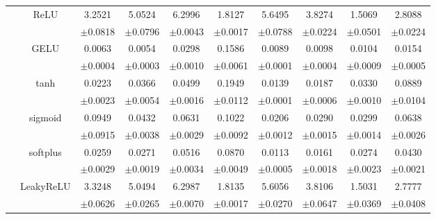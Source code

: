 \documentclass{article}
\begin{document}
\begin{longtable}[h!]{cccccccccc}
        & \multirow{2}{*}{ReLU}
        &3.2521 & 5.0524 & 6.2996 & 1.8127 & 5.6495 & 3.8274 & 1.5069 & 2.8088\\
        &&\scriptsize $\pm$0.0818&\scriptsize$\pm$0.0796&\scriptsize$\pm$0.0043&\scriptsize$\pm$0.0017&\scriptsize$\pm$0.0788&\scriptsize$\pm$0.0224&\scriptsize$\pm$0.0501&\scriptsize$\pm$0.0224\\
        \cline{3-10}\rule{0pt}{2.3ex}

        & \multirow{2}{*}{GELU}
        &0.0063 & 0.0054 & 0.0298 & 0.1586 & 0.0089 & 0.0098 & 0.0104 & 0.0154\\
        &&\scriptsize $\pm$0.0004&\scriptsize$\pm$0.0003&\scriptsize$\pm$0.0010&\scriptsize$\pm$0.0061&\scriptsize$\pm$0.0001&\scriptsize$\pm$0.0004&\scriptsize$\pm$0.0009&\scriptsize$\pm$0.0005\\
        \cline{3-10}\rule{0pt}{2.3ex}

        & \multirow{2}{*}{tanh}
        &0.0223 & 0.0366 & 0.0499 & 0.1949 & 0.0139 & 0.0187 & 0.0330 & 0.0889\\
        &&\scriptsize $\pm$0.0023&\scriptsize$\pm$0.0054&\scriptsize$\pm$0.0016&\scriptsize$\pm$0.0112&\scriptsize$\pm$0.0001&\scriptsize$\pm$0.0006&\scriptsize$\pm$0.0010&\scriptsize$\pm$0.0104\\
        \cline{3-10}\rule{0pt}{2.3ex}

        & \multirow{2}{*}{sigmoid}
        &0.0949 & 0.0432 & 0.0631 & 0.1022 & 0.0206 & 0.0290 & 0.0299 & 0.0638\\
        &&\scriptsize $\pm$0.0915&\scriptsize$\pm$0.0038&\scriptsize$\pm$0.0029&\scriptsize$\pm$0.0092&\scriptsize$\pm$0.0012&\scriptsize$\pm$0.0015&\scriptsize$\pm$0.0014&\scriptsize$\pm$0.0026\\
        \cline{3-10}\rule{0pt}{2.3ex}

        & \multirow{2}{*}{softplus}
        &0.0259 & 0.0271 & 0.0516 & 0.0870 & 0.0113 & 0.0161 & 0.0274 & 0.0430\\
        &&\scriptsize $\pm$0.0029&\scriptsize$\pm$0.0019&\scriptsize$\pm$0.0034&\scriptsize$\pm$0.0049&\scriptsize$\pm$0.0005&\scriptsize$\pm$0.0018&\scriptsize$\pm$0.0023&\scriptsize$\pm$0.0021\\
        \cline{3-10}\rule{0pt}{2.3ex}

        & \multirow{2}{*}{LeakyReLU}
        &3.3248 & 5.0494 & 6.2987 & 1.8135 & 5.6056 & 3.8106 & 1.5031 & 2.7777\\
        &&\scriptsize $\pm$0.0626&\scriptsize$\pm$0.0265&\scriptsize$\pm$0.0070&\scriptsize$\pm$0.0017&\scriptsize$\pm$0.0270&\scriptsize$\pm$0.0647&\scriptsize$\pm$0.0369&\scriptsize$\pm$0.0408\\
        

\end{longtable}
\end{document}
